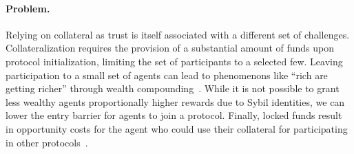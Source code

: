 \documentclass[runningheads]{llncs}
\newcommand{\aza}[1]{\todo[linecolor=blue,backgroundcolor=blue!25,bordercolor=blue,inline,caption={}]{Comment by Alexei: #1}}
\begin{document}
\paragraph{Problem.}
Relying on collateral as trust is itself associated with a different set of challenges. 
Collateralization requires the provision of a substantial amount of funds upon protocol initialization, limiting the set of participants to a selected few.
Leaving participation to a small set of agents can lead to phenomenons like ``rich are getting richer'' through wealth compounding~\cite{Fanti2019Compounding}.
While it is not possible to grant less wealthy agents proportionally higher rewards due to Sybil identities, we can lower the entry barrier for agents to join a protocol.
Finally, locked funds result in opportunity costs for the agent who could use their collateral for participating in other protocols~\cite{Harz2019Balance}.

\end{document}
